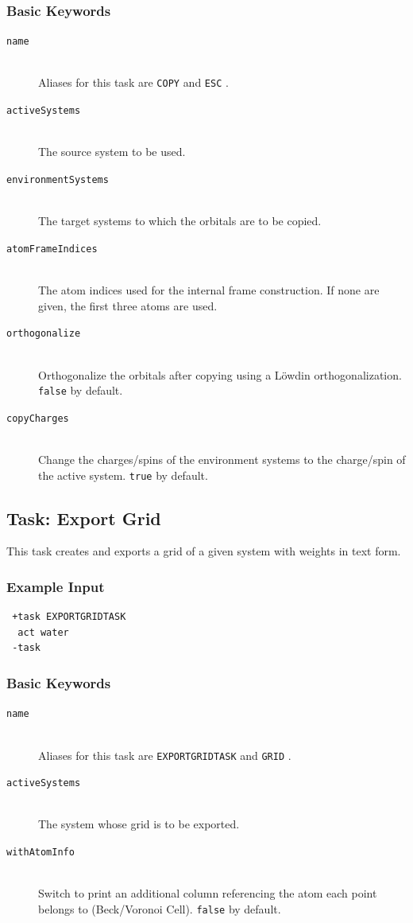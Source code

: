 \documentclass[bibliography=totocnumbered,a4paper,10pt,oneside]{scrbook}
\newcommand{\ttt}[1]{%
  \begingroup\setlength{\fboxsep}{1pt}%
  \colorbox{serenity-green!30}{\texttt{\hspace*{2pt}\vphantom{(g}#1\hspace*{2pt}}}%
  \endgroup
}
\begin{document}
\subsubsection{Basic Keywords}
\begin{description}
\item [\texttt{name}]\hfill \\
  Aliases for this task are \ttt{COPY} and \ttt{ESC}.
\item [\texttt{activeSystems}]\hfill \\
  The source system to be used.
\item [\texttt{environmentSystems}]\hfill \\
  The target systems to which the orbitals are to be copied.
\item [\texttt{atomFrameIndices}]\hfill \\
  The atom indices used for the internal frame construction.
  If none are given, the first three atoms are used.
\item [\texttt{orthogonalize}]\hfill \\
  Orthogonalize the orbitals after copying using a
  Löwdin orthogonalization. \ttt{false} by default.
\item [\texttt{copyCharges}]\hfill \\
  Change the charges/spins of the environment systems
  to the charge/spin of the active system. \ttt{true} by default.
\end{description}

\subsection{Task: Export Grid}
This task creates and exports a grid of a given system with weights in text form.
\subsubsection{Example Input}
\begin{lstlisting}
 +task EXPORTGRIDTASK
  act water
 -task
\end{lstlisting}

\subsubsection{Basic Keywords}
\begin{description}
\item [\texttt{name}]\hfill \\
  Aliases for this task are \ttt{EXPORTGRIDTASK} and \ttt{GRID}.
\item [\texttt{activeSystems}]\hfill \\
  The system whose grid is to be exported.
\item [\texttt{withAtomInfo}]\hfill \\
  Switch to print an additional column referencing the
atom each point belongs to (Beck/Voronoi Cell). \ttt{false} by default.
\end{description}
\end{document}
